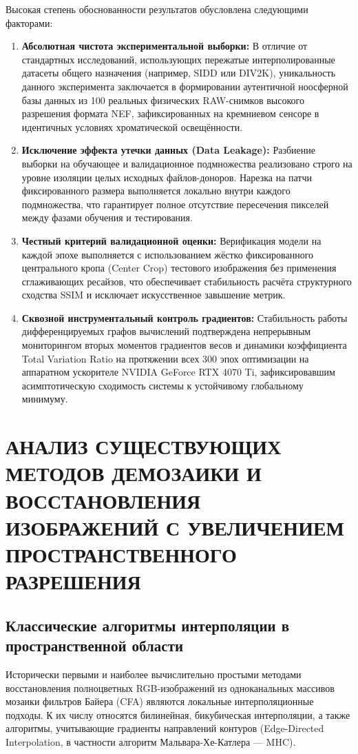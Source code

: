 \documentclass[12pt,a4paper]{article}
\begin{document}
Высокая степень обоснованности результатов обусловлена следующими факторами:
\begin{enumerate}
    \item \textbf{Абсолютная чистота экспериментальной выборки:} В отличие от стандартных исследований, использующих пережатые интерполированные датасеты общего назначения (например, SIDD или DIV2K), уникальность данного эксперимента заключается в формировании аутентичной ноосферной базы данных из 100 реальных физических RAW-снимков высокого разрешения формата NEF, зафиксированных на кремниевом сенсоре в идентичных условиях хроматической освещённости.
    \item \textbf{Исключение эффекта утечки данных (Data Leakage):} Разбиение выборки на обучающее и валидационное подмножества реализовано строго на уровне изоляции целых исходных файлов-доноров. Нарезка на патчи фиксированного размера выполняется локально внутри каждого подмножества, что гарантирует полное отсутствие пересечения пикселей между фазами обучения и тестирования.
    \item \textbf{Честный критерий валидационной оценки:} Верификация модели на каждой эпохе выполняется с использованием жёстко фиксированного центрального кропа (Center Crop) тестового изображения без применения сглаживающих ресайзов, что обеспечивает стабильность расчёта структурного сходства SSIM и исключает искусственное завышение метрик.
    \item \textbf{Сквозной инструментальный контроль градиентов:} Стабильность работы дифференцируемых графов вычислений подтверждена непрерывным мониторингом вторых моментов градиентов весов и динамики коэффициента Total Variation Ratio на протяжении всех 300 эпох оптимизации на аппаратном ускорителе NVIDIA GeForce RTX 4070 Ti, зафиксировавшим асимптотическую сходимость системы к устойчивому глобальному минимуму.
    \end{enumerate}
\section{АНАЛИЗ СУЩЕСТВУЮЩИХ МЕТОДОВ ДЕМОЗАИКИ И ВОССТАНОВЛЕНИЯ ИЗОБРАЖЕНИЙ С УВЕЛИЧЕНИЕМ ПРОСТРАНСТВЕННОГО РАЗРЕШЕНИЯ}

\subsection{Классические алгоритмы интерполяции в пространственной области}

Исторически первыми и наиболее вычислительно простыми методами восстановления полноцветных RGB-изображений из одноканальных массивов мозаики фильтров Байера (CFA) являются локальные интерполяционные подходы. К их числу относятся билинейная, бикубическая интерполяции, а также алгоритмы, учитывающие градиенты направлений контуров (Edge-Directed Interpolation, в частности алгоритм Мальвара-Хе-Катлера — MHC).
\end{document}

